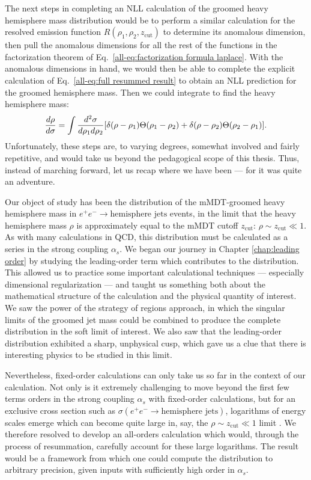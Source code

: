 \documentclass[../thesis.tex]{subfiles}
\providecommand{\zcut}{z_\mathrm{{cut}}}
\begin{document}
	The next steps in completing an NLL calculation of the groomed heavy hemisphere mass distribution would be to perform a similar calculation for the resolved emission function $R(\rho_1, \rho_2, \zcut)$ to determine its anomalous dimension, then pull the anomalous dimensions for all the rest of the functions in the factorization theorem of Eq.~\ref{all-eq:factorization formula laplace}. With the anomalous dimensions in hand, we would then be able to complete the explicit calculation of Eq.~\ref{all-eq:full resummed result} to obtain an NLL prediction for the groomed hemisphere mass. Then we could integrate to find the heavy hemisphere mass:
	\begin{equation}
		\frac{d\rho}{d\sigma} = \int \frac{d^2\sigma}{d\rho_1 d\rho_2}\qty[\delta(\rho - \rho_1)\Theta(\rho_1 - \rho_2) + \delta(\rho - \rho_2)\Theta(\rho_2 - \rho_1)].
	\end{equation}
	Unfortunately, these steps are, to varying degrees, somewhat involved and fairly repetitive, and would take us beyond the pedagogical scope of this thesis. Thus, instead of marching forward, let us recap where we have been --- for it was quite an adventure.

	Our object of study has been the distribution of the mMDT-groomed heavy hemisphere mass in $e^+ e^- \to \text{hemisphere jets}$ events, in the limit that the heavy hemisphere mass $\rho$ is approximately equal to the mMDT cutoff $\zcut$: $\rho \sim \zcut \ll 1$. As with many calculations in QCD, this distribution must be calculated as a series in the strong coupling $\alpha_s$. We began our journey in Chapter \ref{chap:leading order} by studying the leading-order term which contributes to the distribution. This allowed us to practice some important calculational techniques --- especially dimensional regularization --- and taught us something both about the mathematical structure of the calculation and the physical quantity of interest. We saw the power of the strategy of regions approach, in which the singular limits of the groomed jet mass could be combined to produce the complete distribution in the soft limit of interest. We also saw that the leading-order distribution exhibited a sharp, unphysical cusp, which gave us a clue that there is interesting physics to be studied in this limit.

	Nevertheless, fixed-order calculations can only take us so far in the context of our calculation. Not only is it extremely challenging to move beyond the first few terms orders in the strong coupling $\alpha_s$ with fixed-order calculations, but for an exclusive cross section such as $\sigma(e^+ e^- \to \text{hemisphere jets})$, logarithms of energy scales emerge which can become quite large in, say, the $\rho \sim \zcut \ll 1$ limit \cite{larkoski_elementary_2019-1}. We therefore resolved to develop an all-orders calculation which would, through the process of resummation, carefully account for these large logarithms. The result would be a framework from which one could compute the distribution to arbitrary precision, given inputs with sufficiently high order in $\alpha_s$.
\end{document}
